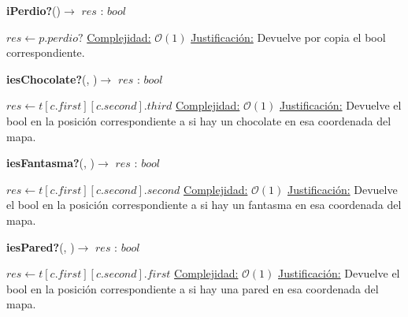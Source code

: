 \documentclass[10pt,a4paper]{article}
\begin{document}
\begin{Algoritmos}
    \begin{algorithm}{\textbf{iPerdio?}()$\to$ $res$ : $bool$}
        \begin{algorithmic}
            \State $res \gets p.perdio?$
            \Statex \underline{Complejidad:} $\mathcal{O}(1)$
            \Statex \underline{Justificación:} Devuelve por copia el bool correspondiente.
        \end{algorithmic}
    \end{algorithm}
    
    \begin{algorithm}{\textbf{iesChocolate?}(, )$\to$ $res$ : $bool$}
        \begin{algorithmic}
            \State $res \gets t[c.first][c.second].third$
            \Statex \underline{Complejidad:} $\mathcal{O}(1)$
            \Statex \underline{Justificación:} Devuelve el bool en la posición correspondiente a si hay un chocolate en esa coordenada del mapa.
        \end{algorithmic}
    \end{algorithm}
    
    \begin{algorithm}{\textbf{iesFantasma?}(, )$\to$ $res$ : $bool$}
        \begin{algorithmic}
            \State $res \gets t[c.first][c.second].second$
            \Statex \underline{Complejidad:} $\mathcal{O}(1)$
            \Statex \underline{Justificación:} Devuelve el bool en la posición correspondiente a si hay un fantasma en esa coordenada del mapa.
        \end{algorithmic}
    \end{algorithm}
    
    \begin{algorithm}{\textbf{iesPared?}(, )$\to$ $res$ : $bool$}
        \begin{algorithmic}
            \State $res \gets t[c.first][c.second].first$
            \Statex \underline{Complejidad:} $\mathcal{O}(1)$
            \Statex \underline{Justificación:} Devuelve el bool en la posición correspondiente a si hay una pared en esa coordenada del mapa.
        \end{algorithmic}
    \end{algorithm}
    

\end{Algoritmos}
\end{document}
